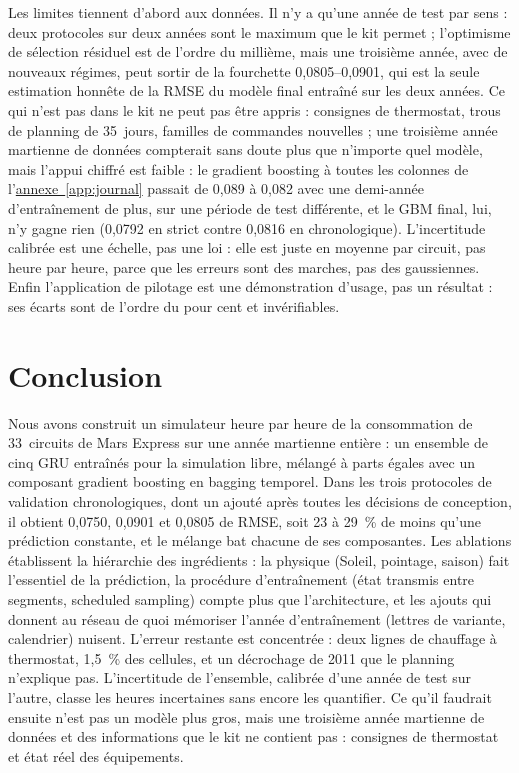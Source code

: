 \documentclass[11pt,a4paper]{article}
\newcommand{\annexeref}[1]{\hyperref[#1]{annexe~\ref*{#1}}}
\begin{document}
Les limites tiennent d'abord aux données. Il n'y a qu'une année de test par sens : deux protocoles sur deux années sont le maximum que le kit permet ; l'optimisme de sélection résiduel est de l'ordre du millième, mais une troisième année, avec de nouveaux régimes, peut sortir de la fourchette 0,0805--0,0901, qui est la seule estimation honnête de la RMSE du modèle final entraîné sur les deux années. Ce qui n'est pas dans le kit ne peut pas être appris : consignes de thermostat, trous de planning de 35~jours, familles de commandes nouvelles ; une troisième année martienne de données compterait sans doute plus que n'importe quel modèle, mais l'appui chiffré est faible : le gradient boosting à toutes les colonnes de l'\annexeref{app:journal} passait de 0,089 à 0,082 avec une demi-année d'entraînement de plus, sur une période de test différente, et le GBM final, lui, n'y gagne rien (0,0792 en strict contre 0,0816 en chronologique). L'incertitude calibrée est une échelle, pas une loi : elle est juste en moyenne par circuit, pas heure par heure, parce que les erreurs sont des marches, pas des gaussiennes. Enfin l'application de pilotage est une démonstration d'usage, pas un résultat : ses écarts sont de l'ordre du pour cent et invérifiables.

\section{Conclusion}\label{sec:conclusion}

Nous avons construit un simulateur heure par heure de la consommation de 33~circuits de Mars Express sur une année martienne entière : un ensemble de cinq GRU entraînés pour la simulation libre, mélangé à parts égales avec un composant gradient boosting en bagging temporel. Dans les trois protocoles de validation chronologiques, dont un ajouté après toutes les décisions de conception, il obtient 0,0750, 0,0901 et 0,0805 de RMSE, soit 23 à 29~\% de moins qu'une prédiction constante, et le mélange bat chacune de ses composantes. Les ablations établissent la hiérarchie des ingrédients : la physique (Soleil, pointage, saison) fait l'essentiel de la prédiction, la procédure d'entraînement (état transmis entre segments, scheduled sampling) compte plus que l'architecture, et les ajouts qui donnent au réseau de quoi mémoriser l'année d'entraînement (lettres de variante, calendrier) nuisent. L'erreur restante est concentrée : deux lignes de chauffage à thermostat, 1,5~\% des cellules, et un décrochage de 2011 que le planning n'explique pas. L'incertitude de l'ensemble, calibrée d'une année de test sur l'autre, classe les heures incertaines sans encore les quantifier. Ce qu'il faudrait ensuite n'est pas un modèle plus gros, mais une troisième année martienne de données et des informations que le kit ne contient pas : consignes de thermostat et état réel des équipements.
\end{document}
